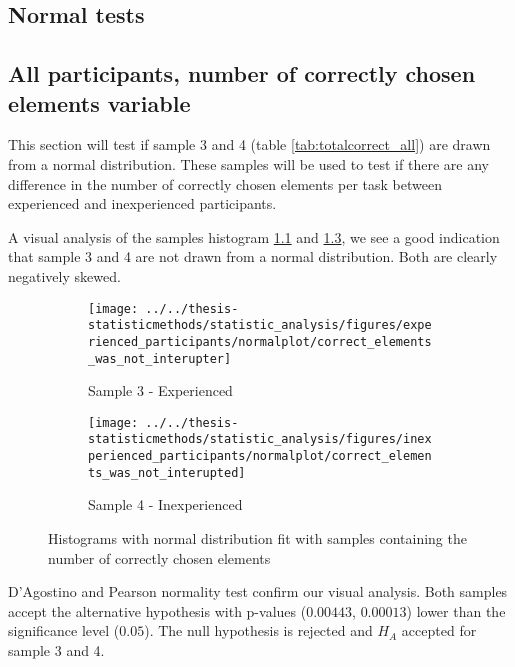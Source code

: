 \begin{appendices}

\chapter{Normal tests}

\section{All participants, number of correctly chosen elements variable}\label{app:normaltest_3_4}
This section will test if sample 3 and 4 (table \ref{tab:totalcorrect_all}) are drawn from a normal distribution. These samples will be used to test if there are any difference in the number of correctly chosen elements per task between experienced and inexperienced participants. 

A visual analysis of the samples histogram \ref{fig:correctelementswasnotinterupter_ex} and \ref{fig:correctelementswasnotinterupted_inex}, we see a good indication that sample 3 and 4 are not drawn from a normal distribution. Both are clearly negatively skewed. 

\begin{figure}[h!]
	\centering
	\begin{subfigure}[b]{0.48\textwidth}
		\centering
		\texttt{[image: ../../thesis-statisticmethods/statistic\_analysis/figures/experienced\_participants/normalplot/correct\_elements\_was\_not\_interupter]}
		\caption{Sample 3 - Experienced}
		\label{fig:correctelementswasnotinterupter_ex}
	\end{subfigure}
	\begin{subfigure}[b]{0.48\textwidth}
		\centering
		\texttt{[image: ../../thesis-statisticmethods/statistic\_analysis/figures/inexperienced\_participants/normalplot/correct\_elements\_was\_not\_interupted]}
		\caption{Sample 4 - Inexperienced}
		\label{fig:correctelementswasnotinterupted_inex}
	\end{subfigure}
	\caption{Histograms with normal distribution fit with samples containing the number of correctly chosen elements}
\end{figure}

D'Agostino and Pearson normality test confirm our visual analysis. Both samples accept the alternative hypothesis with p-values ($0.00443$, $0.00013$) lower than the significance level ($0.05$). The null hypothesis is rejected and $H_A$ accepted for sample 3 and 4.


\end{appendices}
